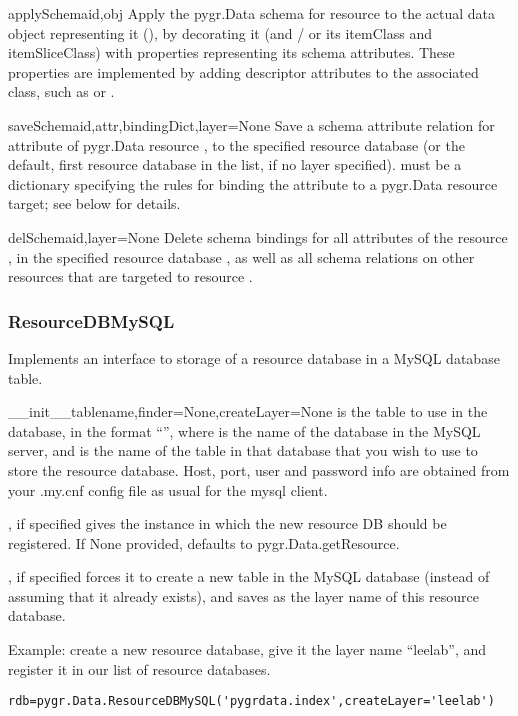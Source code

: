 \documentclass{howto}
\begin{document}
\begin{funcdesc}{applySchema}{id,obj}
  Apply the pygr.Data schema for resource  to the actual data
  object representing it (), by decorating it (and / or its itemClass
  and itemSliceClass) with properties representing its schema attributes.
  These properties are implemented by adding descriptor attributes to the
  associated class, such as  or .
\end{funcdesc}

\begin{funcdesc}{saveSchema}{id,attr,bindingDict,layer=None}
  Save a schema attribute relation for attribute  of pygr.Data
  resource , to the specified resource database  (or the default,
  first resource database in the list, if no layer specified).
   must be a dictionary specifying the rules for
  binding the attribute to a pygr.Data resource target; see below for details.
\end{funcdesc}

\begin{funcdesc}{delSchema}{id,layer=None}
  Delete schema bindings for all attributes of the resource , in
  the specified resource database , as well as all schema relations
  on other resources that are targeted to resource .
\end{funcdesc}

\subsubsection{ResourceDBMySQL}
Implements an interface to storage of a resource database in a MySQL
database table.
\begin{funcdesc}{__init__}{tablename,finder=None,createLayer=None}
   is the table to use in the database, in the format
  ``'', where  is the name of the
  database in the MySQL server, and  is the name of
  the table in that database that you wish to use to store the
  resource database.  Host, port, user and password info are obtained
  from your .my.cnf config file as usual for the mysql client.

  , if specified gives the  instance
  in which the new resource DB should be registered.  If None provided,
  defaults to pygr.Data.getResource.

  , if specified forces it to create a new table
  in the MySQL database (instead of assuming that it already exists),
  and saves  as the layer name of this resource database.

  Example: create a new resource database, give it the layer name ``leelab'',
  and register it in our list of resource databases.
\begin{verbatim}
rdb=pygr.Data.ResourceDBMySQL('pygrdata.index',createLayer='leelab')
\end{verbatim}
\end{funcdesc}
\end{document}
